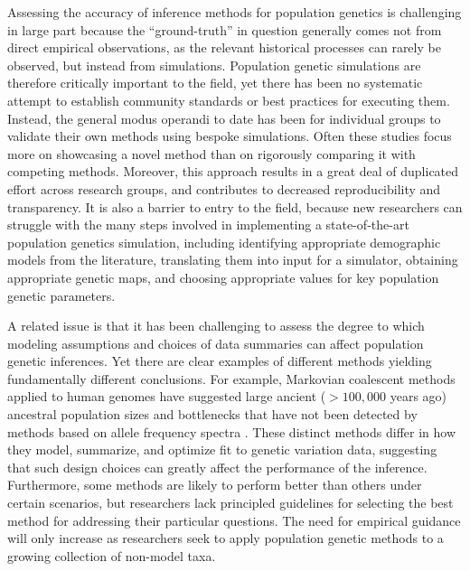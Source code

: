 \documentclass[12pt,halfline,a4paper]{ouparticle}
\begin{document}
Assessing the accuracy of inference methods for population genetics is
challenging in large part because the ``ground-truth'' in question
generally comes not from direct empirical observations, as the relevant
historical processes can rarely be observed, but instead from simulations.
Population genetic simulations are therefore critically important to the
field, yet there has been no systematic attempt to establish community
standards or best practices for executing them. Instead, the general modus
operandi to date has been for individual groups to validate their own
methods using bespoke simulations. 
Often these studies focus more on showcasing a novel method than on
rigorously comparing it with competing methods.
Moreover, this approach results in a great deal of duplicated effort across research
groups, and contributes to decreased reproducibility and transparency.
It is also a barrier to entry to the field, because new researchers can
struggle with 
the many steps involved
in implementing a state-of-the-art population genetics simulation,
including identifying appropriate demographic models from the literature, 
translating them into input for a simulator, obtaining appropriate genetic
maps, and choosing appropriate values for key population genetic parameters.

A related issue is that it has been challenging to assess the degree to which modeling assumptions
and choices of data summaries can affect population
genetic inferences. Yet there
are clear examples of different methods yielding fundamentally
different conclusions. For example, Markovian coalescent methods applied to human genomes have
suggested large ancient ($>100,000$ years ago) ancestral population sizes and
bottlenecks that have not been detected by methods based on allele frequency spectra
\citep[see][]{beichman2017comparison}.
These distinct methods differ in how they model, summarize, and optimize fit to
genetic variation data, suggesting that such design choices can greatly affect the
performance of the inference. Furthermore, some methods are likely to
perform better than others under certain scenarios, but 
researchers lack principled guidelines for selecting the best method for addressing 
their particular questions. The need for empirical
guidance will only increase as researchers 
seek to apply population genetic methods to a growing collection of non-model taxa.
\end{document}
